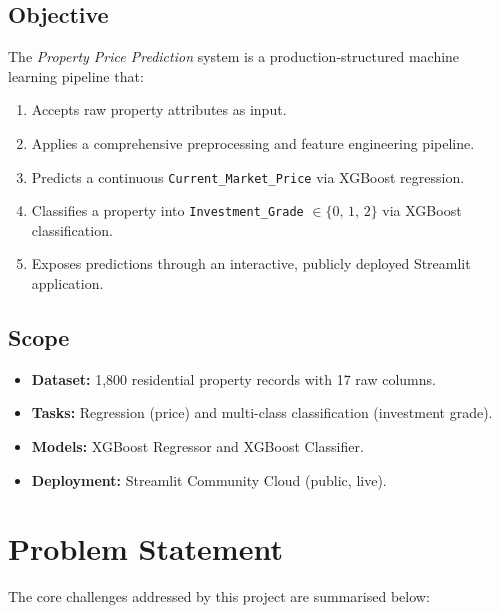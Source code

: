 \documentclass[12pt,a4paper]{article}
\begin{document}
\subsection{Objective}

The \textit{Property Price Prediction} system is a production-structured machine learning
pipeline that:

\begin{enumerate}
    \item Accepts raw property attributes as input.
    \item Applies a comprehensive preprocessing and feature engineering pipeline.
    \item Predicts a continuous \texttt{Current\_Market\_Price} via XGBoost regression.
    \item Classifies a property into \texttt{Investment\_Grade} $\in \{0,\,1,\,2\}$ via XGBoost classification.
    \item Exposes predictions through an interactive, publicly deployed Streamlit application.
\end{enumerate}

\subsection{Scope}

\begin{itemize}[noitemsep]
    \item \textbf{Dataset:} 1,800 residential property records with 17 raw columns.
    \item \textbf{Tasks:} Regression (price) and multi-class classification (investment grade).
    \item \textbf{Models:} XGBoost Regressor and XGBoost Classifier.
    \item \textbf{Deployment:} Streamlit Community Cloud (public, live).
\end{itemize}

\section{Problem Statement}

The core challenges addressed by this project are summarised below:
\end{document}
